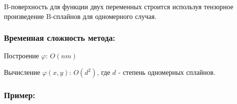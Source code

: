 B-поверхность для функции двух переменных строится используя тензорное произведение B-сплайнов для одномерного случая.

\subsubsection{Временная сложность метода:}

Построение $\varphi$: $O(n m)$

Вычисление $\varphi(x, y)$: $O(d^2)$, где $d$ - степень одномерных сплайнов.

\subsubsection{Пример:}






